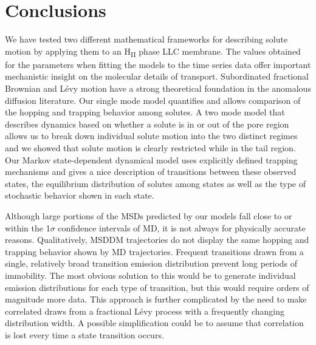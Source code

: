 \documentclass[aps,pre,preprint,groupedaddress]{revtex4-2}
\begin{document}
  \section{Conclusions}
  
  We have tested two different mathematical frameworks for describing solute
  motion by applying them to an H\textsubscript{II} phase LLC membrane. The values
  obtained for the parameters when fitting the models to the time series data 
  offer important mechanistic insight on the molecular details of transport.
  Subordinated fractional Brownian and L\'evy motion have a strong theoretical 
  foundation in the anomalous diffusion literature. Our single mode model
  quantifies and allows comparison of the hopping and trapping behavior 
  among solutes. A two mode model that describes dynamics based on whether
  a solute is in or out of the pore region allows us to break down individual
  solute motion into the two distinct regimes and we showed that solute motion is
  clearly restricted while in the tail region. Our Markov state-dependent dynamical
  model uses explicitly defined trapping mechanisms and gives a nice description 
  of transitions between these observed states, the equilibrium distribution of 
  solutes among states as well as the type of stochastic behavior shown in each 
  state. 
  
  Although large portions of the MSDs predicted by our models fall close to or 
  within the 1$\sigma$ confidence intervals of MD, it is not always for physically
  accurate reasons. Qualitatively, MSDDM trajectories do not display the same hopping
  and trapping behavior shown by MD trajectories. Frequent transitions drawn from a
  single, relatively broad transition emission distribution prevent long periods of
  immobility. The most obvious solution to this would be to generate individual emission
  distributions for each type of transition, but this would require orders of magnitude
  more data. 
  This approach is further complicated by the need to make correlated draws
  from a fractional L\'evy process with a frequently changing distribution width. 
  A possible simplification could be to assume that correlation is lost every time a
  state transition occurs.
\end{document}
